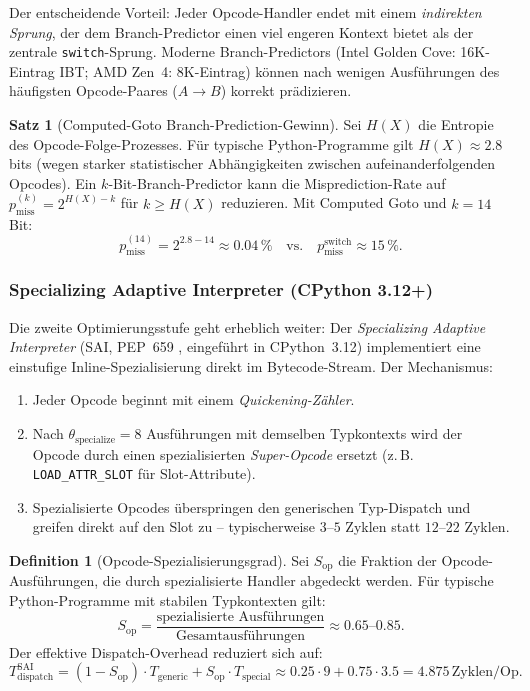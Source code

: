 ﻿\documentclass[a4paper,12pt]{scrreprt}
\theoremstyle{definition}
\newtheorem{definition}{Definition}[section]
\newtheorem{satz}{Satz}[section]
\begin{document}
	Der entscheidende Vorteil: Jeder Opcode-Handler endet mit einem
	\emph{indirekten Sprung}, der dem Branch-Predictor einen viel engeren
	Kontext bietet als der zentrale \texttt{switch}-Sprung. Moderne
	Branch-Predictors (Intel Golden Cove: 16K-Eintrag IBT; AMD Zen~4:
	8K-Eintrag) können nach wenigen Ausführungen des häufigsten
	Opcode-Paares ($A \to B$) korrekt prädizieren.
	
	\begin{satz}[Computed-Goto Branch-Prediction-Gewinn]
		\label{satz:computed_goto}
		Sei $H(X)$ die Entropie des Opcode-Folge-Prozesses. Für typische
		Python-Programme gilt $H(X) \approx 2.8$\,bits (wegen starker
		statistischer Abhängigkeiten zwischen aufeinanderfolgenden Opcodes).
		Ein $k$-Bit-Branch-Predictor kann die Misprediction-Rate auf
		$p_{\mathrm{miss}}^{(k)} = 2^{H(X) - k}$ für $k \ge H(X)$
		reduzieren. Mit Computed Goto und $k = 14$ Bit:
		\[
		p_{\mathrm{miss}}^{(14)} = 2^{2.8 - 14} \approx 0.04\,\%
		\quad \text{vs.} \quad p_{\mathrm{miss}}^{\mathrm{switch}} \approx 15\,\%.
		\]
	\end{satz}
	
	\subsubsection{Specializing Adaptive Interpreter (CPython 3.12+)}
	
	Die zweite Optimierungsstufe geht erheblich weiter: Der
	\emph{Specializing Adaptive Interpreter} (SAI, PEP~659 \cite{pep659},
	eingeführt in CPython~3.12) implementiert eine einstufige
	Inline-Spezialisierung direkt im Bytecode-Stream. Der Mechanismus:
	
	\begin{enumerate}[noitemsep]
		\item Jeder Opcode beginnt mit einem \emph{Quickening-Zähler}.
		\item Nach $\theta_{\mathrm{specialize}} = 8$ Ausführungen mit
		demselben Typkontexts wird der Opcode durch einen
		spezialisierten \emph{Super-Opcode} ersetzt
		(z.\,B. \texttt{LOAD\_ATTR\_SLOT} für Slot-Attribute).
		\item Spezialisierte Opcodes überspringen den generischen
		Typ-Dispatch und greifen direkt auf den Slot zu --
		typischerweise $3$--$5$ Zyklen statt $12$--$22$ Zyklen.
	\end{enumerate}
	
	\begin{definition}[Opcode-Spezialisierungsgrad]
		\label{def:specialization}
		Sei $S_{\mathrm{op}}$ die Fraktion der Opcode-Ausfüh\-run\-gen, die
		durch spezialisierte Handler abgedeckt werden. Für typische
		Python-Programme mit stabilen Typkontexten gilt:
		\[
		S_{\mathrm{op}} = \frac{\text{spezialisierte Ausführungen}}
		{\text{Gesamtausführungen}} \approx 0.65\text{--}0.85.
		\]
		Der effektive Dispatch-Overhead reduziert sich auf:
		\[
		T_{\mathrm{dispatch}}^{\mathrm{SAI}} = (1 - S_{\mathrm{op}}) \cdot T_{\mathrm{generic}}
		+ S_{\mathrm{op}} \cdot T_{\mathrm{special}}
		\approx 0.25 \cdot 9 + 0.75 \cdot 3.5 = 4.875\,\mathrm{Zyklen/Op}.
		\]
	\end{definition}
	
\end{document}
